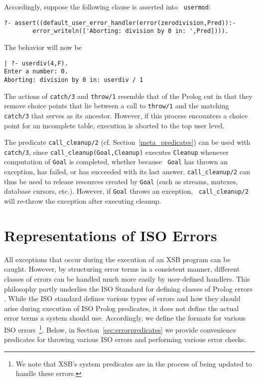 Accordingly, suppose the following clause is asserted into {\tt
usermod}:
%
\begin{small}
\begin{verbatim}
?- assert((default_user_error_handler(error(zerodivision,Pred)):- 
        error_writeln(['Aborting: division by 0 in: ',Pred]))).
\end{verbatim}
\end{small}
%
The behavior will now be
\begin{small}
\begin{verbatim}
| ?- userdiv(4,F).
Enter a number: 0.
Aborting: division by 0 in: userdiv / 1
\end{verbatim}
\end{small}
The actions of {\tt catch/3} and {\tt throw/1} resemble that of the
Prolog cut in that they remove choice points that lie between a call
to {\tt throw/1} and the matching {\tt catch/3} that serves as its
ancestor.  However, if this process encounters a choice point for an
incomplete table, execution is aborted to the top user level.

The predicate {\tt call\_cleanup/2}
(cf. Section~\ref{meta_predicates}) can be used with {\tt catch/3},
since {\tt call\_cleanup(Goal,Cleanup)} executes {\tt Cleanup}
whenever computation of {\tt Goal} is completed, whether because {\tt
  Goal} has thrown an exception, has failed, or has succeeded with its
last answer.  {\tt call\_cleanup/2} can thus be used to release
resources created by {\tt Goal} (such as streams, mutexes, database
cursors, etc.).  However, if {\tt Goal} throws an exception, {\tt
  call\_cleanup/2} will re-throw the exception after executing cleanup.

\section{Representations of ISO Errors} \label{sec:iso-errors}

All exceptions that occur during the execution of an XSB program can
be caught.  However, by structuring error terms in a consistent
manner, different classes of errors can be handled much more easily by
user-defined handlers.  This philosophy partly underlies the ISO
Standard for defining classes of Prolog errors \cite{ISO-Prolog}.
While the ISO standard defines various types of errors and how they
should arise during execution of ISO Prolog predicates, it does not
define the actual error terms a system should use.  Accordingly, we
define the formats for various ISO errors~\footnote{We note that XSB's
  system predicates are in the process of being updated to handle
  these errors.}.  Below, in Section~\ref{sec:errorpredicates} we
provide convenience predicates for throwing various ISO errors and
performing various error checks.

